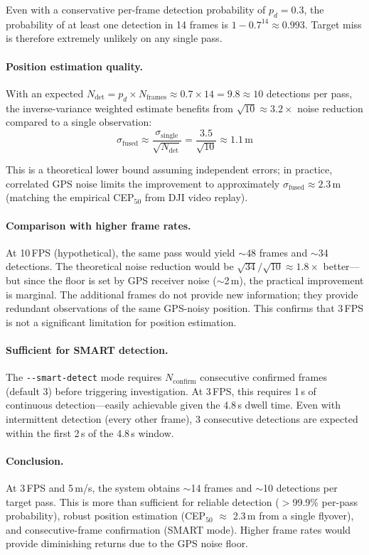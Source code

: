 \noindent Even with a conservative per-frame detection probability of $p_d = 0.3$, the probability of at least one detection in 14 frames is $1 - 0.7^{14} \approx 0.993$.  Target miss is therefore extremely unlikely on any single pass.

\paragraph{Position estimation quality.}
With an expected $N_\mathrm{det} = p_d \times N_\mathrm{frames} \approx 0.7 \times 14 = 9.8 \approx 10$ detections per pass, the inverse-variance weighted estimate benefits from $\sqrt{10} \approx 3.2\times$ noise reduction compared to a single observation:
\begin{equation}
  \sigma_\mathrm{fused} \approx \frac{\sigma_\mathrm{single}}{\sqrt{N_\mathrm{det}}} = \frac{3.5}{\sqrt{10}} \approx 1.1\,\mathrm{m}
\end{equation}

\noindent This is a theoretical lower bound assuming independent errors; in practice, correlated GPS noise limits the improvement to approximately $\sigma_\mathrm{fused} \approx 2.3$\,m (matching the empirical CEP$_{50}$ from DJI video replay).

\paragraph{Comparison with higher frame rates.}
At 10\,FPS (hypothetical), the same pass would yield $\sim$48 frames and $\sim$34 detections.  The theoretical noise reduction would be $\sqrt{34}/\sqrt{10} \approx 1.8\times$ better---but since the floor is set by GPS receiver noise ($\sim$2\,m), the practical improvement is marginal.  The additional frames do not provide new information; they provide redundant observations of the same GPS-noisy position.  This confirms that 3\,FPS is not a significant limitation for position estimation.

\paragraph{Sufficient for SMART detection.}
The \texttt{-{}-smart-detect} mode requires $N_\mathrm{confirm}$ consecutive confirmed frames (default 3) before triggering investigation.  At 3\,FPS, this requires 1\,s of continuous detection---easily achievable given the 4.8\,s dwell time.  Even with intermittent detection (every other frame), 3 consecutive detections are expected within the first 2\,s of the 4.8\,s window.

\paragraph{Conclusion.}
At 3\,FPS and 5\,m/s, the system obtains $\sim$14 frames and $\sim$10 detections per target pass.  This is more than sufficient for reliable detection ($>$99.9\% per-pass probability), robust position estimation (CEP$_{50}$ $\approx$ 2.3\,m from a single flyover), and consecutive-frame confirmation (SMART mode).  Higher frame rates would provide diminishing returns due to the GPS noise floor.
